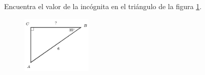\question[15]  Encuentra el valor de la incógnita en el triángulo de la figura \ref{fig:lados_functrig_15}.
\begin{figure}[H]
    \begin{center}
        \includegraphics[width=0.3\textwidth]{../images/lados_functrig_15.png}
    \end{center}
    \caption{}
    \label{fig:lados_functrig_15}
\end{figure}